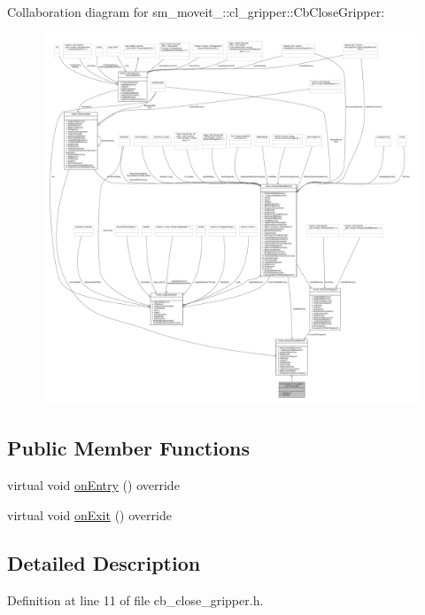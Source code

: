 Collaboration diagram for sm\+\_\+moveit\+\_\+:\+:cl\+\_\+gripper\+:\+:Cb\+Close\+Gripper\+:
\nopagebreak
\begin{figure}[H]
\begin{center}
\leavevmode
\includegraphics[width=350pt]{classsm__moveit__2_1_1cl__gripper_1_1CbCloseGripper__coll__graph}
\end{center}
\end{figure}
\subsection*{Public Member Functions}
\begin{DoxyCompactItemize}
\item 
virtual void \hyperlink{classsm__moveit__2_1_1cl__gripper_1_1CbCloseGripper_aa2b903fc41ba2aecdb00d5f1804cfb75}{on\+Entry} () override
\item 
virtual void \hyperlink{classsm__moveit__2_1_1cl__gripper_1_1CbCloseGripper_a6dfd0cf0abefda948c23767508cd8d86}{on\+Exit} () override
\end{DoxyCompactItemize}


\subsection{Detailed Description}


Definition at line 11 of file cb\+\_\+close\+\_\+gripper.\+h.



